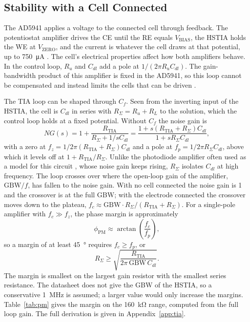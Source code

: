 \subsection{Stability with a Cell Connected}
\label{sec:stability}

The AD5941 applies a voltage to the connected cell through feedback. The potentiostat amplifier drives the CE until the RE equals $V_\mathrm{BIAS}$, the HSTIA holds the WE at $V_\mathrm{ZERO}$, and the
current is whatever the cell draws at that potential, up to
\SI{750}{\micro\ampere} \cite[p.~9]{ad5941_ds}. The cell's electrical properties affect how both amplifiers behave. In the control loop, $R_u$ and $C_{dl}$ add a pole at
$1/(2\pi R_uC_{dl})$. The gain-bandwidth product of this amplifier is fixed in
the AD5941, so this loop cannot be compensated and instead limits the cells
that can be driven \cite{bard2001}. 

The TIA loop can be shaped through $C_f$. Seen from the inverting input of the HSTIA, the cell is $C_{dl}$ in series
with $R_\Sigma = R_u + R_L$ to the solution, which the control loop holds at
a fixed potential. Without $C_f$ the noise gain is
\begin{equation}
  NG(s) = 1 + \frac{R_\mathrm{TIA}}{R_\Sigma + 1/sC_{dl}}
        = \frac{1 + s\left(R_\mathrm{TIA} + R_\Sigma\right)C_{dl}}{1 + sR_\Sigma C_{dl}},
  \label{eq:ng_series}
\end{equation}
with a zero at $f_z = 1/2\pi(R_\mathrm{TIA}+R_\Sigma)C_{dl}$ and a pole at
$f_p = 1/2\pi R_\Sigma C_{dl}$, above which it levels off at
$1 + R_\mathrm{TIA}/R_\Sigma$. Unlike the photodiode amplifier often used as a
model for this circuit \cite{graeme1996photodiode}, whose noise gain keeps
rising, $R_\Sigma$ isolates $C_{dl}$ at high frequency. The loop crosses over
where the open-loop gain of the amplifier, $\mathrm{GBW}/f$, has fallen to the
noise gain. With no cell connected the noise gain is 1 and the crossover is at
the full GBW; with the electrode connected the crossover moves down to the
plateau,
$f_c \approx \mathrm{GBW}\cdot R_\Sigma/(R_\mathrm{TIA}+R_\Sigma)$. For a
single-pole amplifier with $f_c \gg f_z$, the phase margin is
approximately \cite{c2}
\begin{equation}
  \phi_\mathrm{PM} \approx \arctan\left(\frac{f_c}{f_p}\right),
  \label{eq:pm_approx}
\end{equation}
so a margin of at least \SI{45}{\degree} requires $f_c \geq f_p$, or
\begin{equation}
  R_\Sigma \geq \sqrt{\frac{R_\mathrm{TIA}}{2\pi\,\mathrm{GBW}\,C_{dl}}}.
  \label{eq:rmin}
\end{equation}
The margin is smallest on the largest gain resistor with the smallest series
resistance. The datasheet does not give the GBW of the HSTIA, so a
conservative \SI{1}{\mega\hertz} is assumed; a larger value would only increase the
margins. Table~\ref{tab:pm} gives the margin on the \SI{160}{\kilo\ohm} range, computed from the full loop gain. The full derivation is given in Appendix~\ref{app:tia}.


